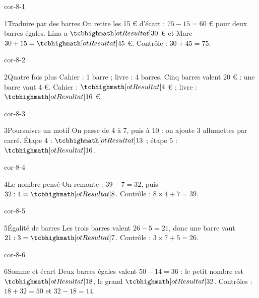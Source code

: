 \clearpage\pagestyle{otMain}\setlength{\otBlocEspacement}{2.5mm}\fontsize{11}{15}\selectfont{}
\begin{blocLivre}{cor-8-1}\begin{corrige}{1}{Traduire par des barres}
On retire les 15 € d’écart : $75-15=60$ € pour deux barres égales. Lina a $\res{30}$ € et Marc $30+15=\res{45}$ €. Contrôle : $30+45=75$.
\label{fig-cor-8-1}
\end{corrige}\end{blocLivre}
\begin{blocLivre}{cor-8-2}\begin{corrige}{2}{Quatre fois plus}
Cahier : 1 barre ; livre : 4 barres. Cinq barres valent 20 € : une barre vaut 4 €. Cahier : $\res4$ € ; livre : $\res{16}$ €.
\end{corrige}\end{blocLivre}
\begin{blocLivre}{cor-8-3}\begin{corrige}{3}{Poursuivre un motif}
On passe de 4 à 7, puis à 10 : on ajoute 3 allumettes par carré. Étape 4 : $\res{13}$ ; étape 5 : $\res{16}$.
\label{fig-cor-8-3}
\end{corrige}\end{blocLivre}
\begin{blocLivre}{cor-8-4}\begin{corrige}{4}{Le nombre pensé}
On remonte : $39-7=32$, puis $32:4=\res8$. Contrôle : $8\times4+7=39$.
\end{corrige}\end{blocLivre}
\begin{blocLivre}{cor-8-5}\begin{corrige}{5}{Égalité de barres}
Les trois barres valent $26-5=21$, donc une barre vaut $21:3=\res7$. Contrôle : $3\times7+5=26$.
\label{fig-cor-8-5}
\end{corrige}\end{blocLivre}
\begin{blocLivre}{cor-8-6}\begin{corrige}{6}{Somme et écart}
Deux barres égales valent $50-14=36$ : le petit nombre est $\res{18}$, le grand $\res{32}$. Contrôles : $18+32=50$ et $32-18=14$.
\end{corrige}\end{blocLivre}
